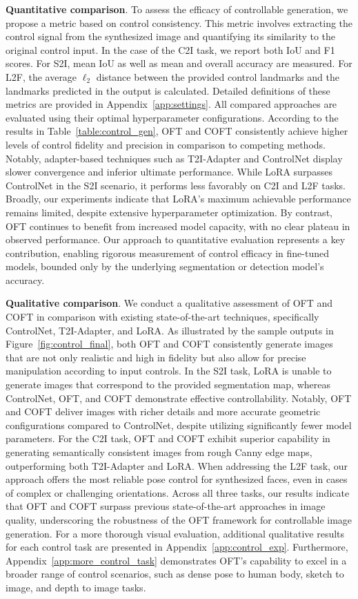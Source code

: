 \textbf{Quantitative comparison}. To assess the efficacy of controllable generation, we propose a metric based on control consistency. This metric involves extracting the control signal from the synthesized image and quantifying its similarity to the original control input. In the case of the C2I task, we report both IoU and F1 scores. For S2I, mean IoU as well as mean and overall accuracy are measured. For L2F, the average $\ell_2$ distance between the provided control landmarks and the landmarks predicted in the output is calculated. Detailed definitions of these metrics are provided in Appendix~\ref{app:settings}. All compared approaches are evaluated using their optimal hyperparameter configurations. According to the results in Table~\ref{table:control_gen}, OFT and COFT consistently achieve higher levels of control fidelity and precision in comparison to competing methods. Notably, adapter-based techniques such as T2I-Adapter and ControlNet display slower convergence and inferior ultimate performance. While LoRA surpasses ControlNet in the S2I scenario, it performs less favorably on C2I and L2F tasks. Broadly, our experiments indicate that LoRA’s maximum achievable performance remains limited, despite extensive hyperparameter optimization. By contrast, OFT continues to benefit from increased model capacity, with no clear plateau in observed performance. Our approach to quantitative evaluation represents a key contribution, enabling rigorous measurement of control efficacy in fine-tuned models, bounded only by the underlying segmentation or detection model’s accuracy.

\textbf{Qualitative comparison}. We conduct a qualitative assessment of OFT and COFT in comparison with existing state-of-the-art techniques, specifically ControlNet, T2I-Adapter, and LoRA. As illustrated by the sample outputs in Figure~\ref{fig:control_final}, both OFT and COFT consistently generate images that are not only realistic and high in fidelity but also allow for precise manipulation according to input controls. In the S2I task, LoRA is unable to generate images that correspond to the provided segmentation map, whereas ControlNet, OFT, and COFT demonstrate effective controllability. Notably, OFT and COFT deliver images with richer details and more accurate geometric configurations compared to ControlNet, despite utilizing significantly fewer model parameters. For the C2I task, OFT and COFT exhibit superior capability in generating semantically consistent images from rough Canny edge maps, outperforming both T2I-Adapter and LoRA. When addressing the L2F task, our approach offers the most reliable pose control for synthesized faces, even in cases of complex or challenging orientations. Across all three tasks, our results indicate that OFT and COFT surpass previous state-of-the-art approaches in image quality, underscoring the robustness of the OFT framework for controllable image generation. For a more thorough visual evaluation, additional qualitative results for each control task are presented in Appendix~\ref{app:control_exp}. Furthermore, Appendix~\ref{app:more_control_task} demonstrates OFT’s capability to excel in a broader range of control scenarios, such as dense pose to human body, sketch to image, and depth to image tasks.

